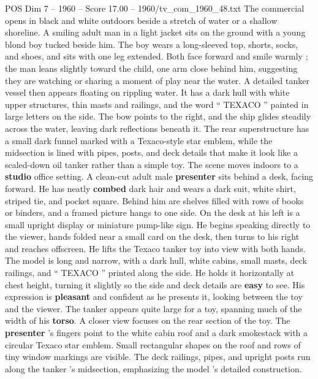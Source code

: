 \begin{textsample}{POS Dim 7 – 1960 – Score 17.00 – 1960/tv\_com\_1960\_48.txt}  \label{ex:f7_pos_021}
The commercial opens in black and white outdoors beside a stretch of water or a shallow shoreline.
A smiling adult man in a light jacket sits on the ground with a young blond boy tucked beside him.
The boy wears a long-sleeved top, shorts, socks, and shoes, and sits with one leg extended.
Both face forward and smile warmly ; the man leans slightly toward the child, one arm close behind him, suggesting they are watching or sharing a moment of play near the water.
A detailed tanker vessel then appears floating on rippling water.
It has a dark hull with white upper structures, thin masts and railings, and the word “ TEXACO ” painted in large letters on the side.
The bow points to the right, and the ship glides steadily across the water, leaving dark reflections beneath it.
The rear superstructure has a small dark funnel marked with a Texaco-style star emblem, while the midsection is lined with pipes, posts, and deck details that make it look like a scaled-down oil tanker rather than a simple toy.
The scene moves indoors to a \textbf{studio} office setting.
A clean-cut adult male \textbf{presenter} sits behind a desk, facing forward.
He has neatly \textbf{combed} dark hair and wears a dark suit, white shirt, striped tie, and pocket square.
Behind him are shelves filled with rows of books or binders, and a framed picture hangs to one side.
On the desk at his left is a small upright display or miniature pump-like sign.
He begins speaking directly to the viewer, hands folded near a small card on the desk, then turns to his right and reaches offscreen.
He lifts the Texaco tanker toy into view with both hands.
The model is long and narrow, with a dark hull, white cabins, small masts, deck railings, and “ TEXACO ” printed along the side.
He holds it horizontally at chest height, turning it slightly so the side and deck details are \textbf{easy} to see.
His expression is \textbf{pleasant} and confident as he presents it, looking between the toy and the viewer.
The tanker appears quite large for a toy, spanning much of the width of his \textbf{torso}.
A closer view focuses on the rear section of the toy.
The \textbf{presenter} ’s fingers point to the white cabin roof and a dark smokestack with a circular Texaco star emblem.
Small rectangular shapes on the roof and rows of tiny window markings are visible.
The deck railings, pipes, and upright posts run along the tanker ’s midsection, emphasizing the model ’s detailed construction.

\end{textsample}
